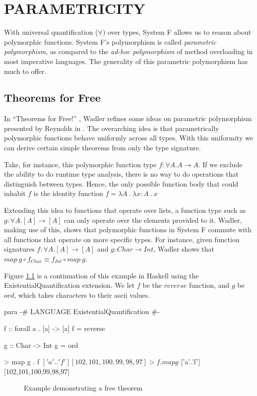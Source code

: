 \chapter{PARAMETRICITY}\label{ch:parametricity}
With universal quantification ($\forall $) over types, System F allows us to reason about polymorphic functions. System F's polymorphism is called \emph{parametric polymorphism}, as compared to the \emph{ad-hoc polymorphism} of method overloading in most imperative languages. The generality of this parametric polymorphism has much to offer.

\section{Theorems for Free}
In ``Theorems for Free!'' \cite{theoremsForFree}, Wadler refines some ideas on parametric polymorphism presented by Reynolds in \cite{reynolds}. The overarching idea is that parametrically polymorphic functions behave uniformly across all types. With this uniformity we can derive certain simple theorems from only the type signature.

Take, for instance, this polymorphic function type $f : \forall A . A \rightarrow A$. If we exclude the ability to do runtime type analysis, there is no way to do operations that distinguish between types. Hence, the only possible function body that could inhabit $f$ is the identity function $f = \lambda A\ .\ \lambda x : A\ .\ x $

Extending this idea to functions that operate over lists, a function type such as $g : \forall A . [A] \rightarrow [A] $ can only operate over the elements provided to it. Wadler, making use of this, shows that polymorphic functions in System F commute with all functions that operate on more specific types. For instance, given function signatures $f : \forall A . [A] \rightarrow [A]$ and $g : Char \rightarrow Int$, Wadler shows that $map\ g \circ f_{Char} \equiv f_{Int} \circ map\ g$.

Figure \ref{fig:para} is a continuation of this example in Haskell using the ExistentialQuantification extension. We let $f$ be the $reverse$ function, and $g$ be $ord$, which takes characters to their ascii values.
\begin{SaveVerbatim}{para}
{-# LANGUAGE ExistentialQuantification #-}

f :: forall a . [a] -> [a]
f = reverse

g :: Char -> Int
g = ord

> map g . f $ ['a'..'f']
[102,101,100,99,98,97]

> f . map g $ ['a'..'f']
[102,101,100,99,98,97]
\end{SaveVerbatim}
\begin{figure}
  \caption{Example demonstrating a free theorem}
  \label{fig:para}
\end{figure}

